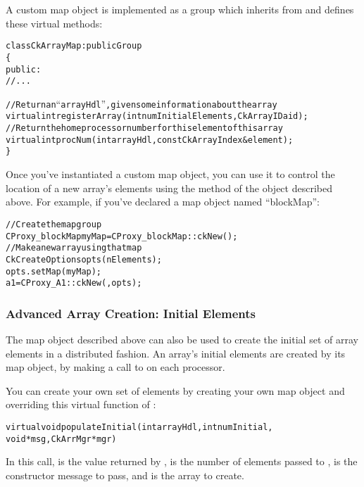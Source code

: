 A custom map object is implemented as a group which inherits from
 and defines these virtual methods:

\begin{alltt}
class CkArrayMap : public Group
\{
public:
  //...
  
  //Return an ``arrayHdl'', given some information about the array
  virtual int registerArray(int numInitialElements,CkArrayID aid);
  //Return the home processor number for this element of this array
  virtual int procNum(int arrayHdl,const CkArrayIndex &element);
\}
\end{alltt}

Once you've instantiated a custom map object, you can use it to
control the location of a new array's elements using the
 method of the  object described above.
For example, if you've declared a map object named ``blockMap'':

\begin{alltt}
//Create the map group
  CProxy_blockMap myMap=CProxy_blockMap::ckNew();
//Make a new array using that map
  CkCreateOptions opts(nElements);
  opts.setMap(myMap);
  a1=CProxy_A1::ckNew(,opts);
\end{alltt}



\subsubsection{Advanced Array Creation: Initial Elements}
\label{array initial}

The map object described above can also be used to create
the initial set of array elements in a distributed fashion.
An array's initial elements are created by its map object,
by making a call to  on each processor.

You can create your own set of elements by creating your
own map object and overriding this virtual function of :

\begin{alltt}
  virtual void populateInitial(int arrayHdl,int numInitial,
	void *msg,CkArrMgr *mgr)
\end{alltt}

In this call,  is the value returned by ,
 is the number of elements passed to ,
 is the constructor message to pass, and  is the
array to create.

